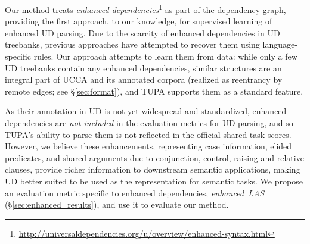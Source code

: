 \documentclass[11pt,a4paper]{article}
\begin{document}
Our method treats \textit{enhanced dependencies}\footnote{\url{http://universaldependencies.org/u/overview/enhanced-syntax.html}}
as part of the dependency graph, providing the first approach, to our knowledge,
for supervised learning of enhanced UD parsing.
Due to the scarcity of enhanced dependencies in UD treebanks,
previous approaches
\cite{SCHUSTER16.779,D17-1009} have attempted to recover them
using language-specific rules.
Our approach attempts to learn them from data:
while only a few UD treebanks contain any enhanced dependencies,
similar structures are an integral part of UCCA and its annotated corpora
(realized as reentrancy by remote edges; see \S\ref{sec:format}),
and TUPA supports them as a standard feature.

As their annotation in UD is not yet widespread and standardized,
enhanced dependencies are \textit{not included}
in the evaluation metrics for UD parsing,
and so TUPA's ability to parse them is not reflected in the official
shared task scores.
However, we believe these enhancements, representing
case information, elided predicates,
and shared arguments due to conjunction, control, raising
and relative clauses,
provide richer information to downstream semantic applications,
making UD better suited to be used as the representation for semantic tasks.
We propose an evaluation metric specific to enhanced dependencies,
\textit{enhanced~LAS} (\S\ref{sec:enhanced_results}),
and use it to evaluate our method.


\end{document}
